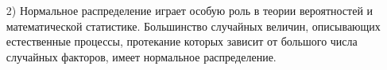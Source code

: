 \begin{enumerate}
\item[2)] Нормальное распределение играет особую роль в теории вероятностей и математической статистике. Большинство случайных величин, описывающих естественные процессы, протекание которых зависит от большого числа случайных факторов, имеет нормальное распределение.
\end{enumerate}

























